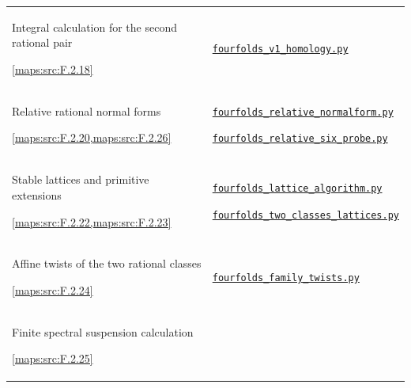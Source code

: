 \documentclass[11pt,a4paper]{article}
\numberwithin{equation}{section}
\theoremstyle{definition}
\newcommand{\SsixRepositoryCommit}{83d76022bcd442278b760db9ff438afceed6c6ea}
\begin{document}
\begin{longtable}{@{}p{}p{}@{}}
\hypertarget{prog:V:second-pair}{}Integral calculation for the second rational pair\par \cref{maps:src:F.2.18} &
\href{https://github.com/KokunoYumeto/s6-complex-structure-workbench/blob/\SsixRepositoryCommit/pro_returns/S6_10_PAPERS_checkpoint_15_20261119T1045Z/S6_10_PAPERS/code/V/replay_chains/code/fourfolds_v1_homology.py}{\nolinkurl{fourfolds_v1_homology.py}} \\[3pt]
\hypertarget{prog:V:normal-forms}{}Relative rational normal forms\par \cref{maps:src:F.2.20,maps:src:F.2.26} &
\href{https://github.com/KokunoYumeto/s6-complex-structure-workbench/blob/\SsixRepositoryCommit/pro_returns/S6_10_PAPERS_checkpoint_15_20261119T1045Z/S6_10_PAPERS/code/V/replay_chains/code/fourfolds_relative_normalform.py}{\nolinkurl{fourfolds_relative_normalform.py}}\par \href{https://github.com/KokunoYumeto/s6-complex-structure-workbench/blob/\SsixRepositoryCommit/pro_returns/S6_10_PAPERS_checkpoint_15_20261119T1045Z/S6_10_PAPERS/code/V/replay_chains/code/fourfolds_relative_six_probe.py}{\nolinkurl{fourfolds_relative_six_probe.py}} \\[3pt]
\hypertarget{prog:V:lattices}{}Stable lattices and primitive extensions\par \cref{maps:src:F.2.22,maps:src:F.2.23} &
\href{https://github.com/KokunoYumeto/s6-complex-structure-workbench/blob/\SsixRepositoryCommit/pro_returns/S6_10_PAPERS_checkpoint_15_20261119T1045Z/S6_10_PAPERS/code/V/replay_chains/code/fourfolds_lattice_algorithm.py}{\nolinkurl{fourfolds_lattice_algorithm.py}}\par \href{https://github.com/KokunoYumeto/s6-complex-structure-workbench/blob/\SsixRepositoryCommit/pro_returns/S6_10_PAPERS_checkpoint_15_20261119T1045Z/S6_10_PAPERS/code/V/replay_chains/code/fourfolds_two_classes_lattices.py}{\nolinkurl{fourfolds_two_classes_lattices.py}} \\[3pt]
\hypertarget{prog:V:twists}{}Affine twists of the two rational classes\par \cref{maps:src:F.2.24} &
\href{https://github.com/KokunoYumeto/s6-complex-structure-workbench/blob/\SsixRepositoryCommit/pro_returns/S6_10_PAPERS_checkpoint_15_20261119T1045Z/S6_10_PAPERS/code/V/replay_chains/code/fourfolds_family_twists.py}{\nolinkurl{fourfolds_family_twists.py}} \\[3pt]
\hypertarget{prog:V:suspension}{}Finite spectral suspension calculation\par \cref{maps:src:F.2.25} &

\end{longtable}
\end{document}
